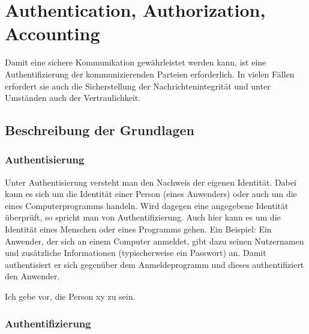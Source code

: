 \documentclass[letterpaper, 12pt]{article}
\let\tempsection\section
\renewcommand\section[1]{\vspace{-0.3cm}\tempsection{#1}\vspace{-0.3cm}}
\let\tempsubsection\subsection
\renewcommand\subsection[1]{\vspace{0cm}\tempsubsection{#1}\vspace{0cm}}
\let\tempsubsubsection\subsubsection
\renewcommand\subsubsection[1]{\vspace{0cm}\tempsubsubsection{#1}\vspace{0cm}}
\begin{document}
\clearpage

\section{Authentication, Authorization, Accounting}

Damit eine sichere Kommunikation gewährleistet werden kann, ist eine Authentifizierung der kommunizierenden Parteien erforderlich. In vielen Fällen erfordert sie auch die Sicherstellung der Nachrichtenintegrität und unter Umständen auch der Vertraulichkeit. \cite{ausarbeitungauth}

\subsection{Beschreibung der Grundlagen}

\subsubsection{Authentisierung}

Unter Authentisierung versteht man den Nachweis der eigenen Identität. Dabei kann es sich um die Identität einer Person (eines Anwenders) oder auch um die eines Computerprogramms handeln. Wird dagegen eine angegebene Identität überprüft, so spricht man von Authentifizierung. Auch hier kann es um die Identität eines Menschen oder eines Programms gehen. Ein Beispiel: Ein Anwender, der sich an einem Computer anmeldet, gibt dazu seinen Nutzernamen und zusätzliche Informationen (typischerweise ein Passwort) an. Damit authentisiert er sich gegenüber dem Anmeldeprogramm und dieses authentifiziert den Anwender. \cite{ausarbeitungauth}

\begin{center}
	Ich gebe vor, die Person xy zu sein.
\end{center}

\subsubsection{Authentifizierung}
\end{document}
